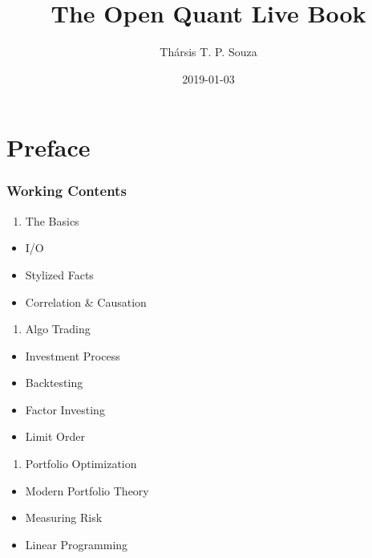 \documentclass[]{book}
\title{The Open Quant Live Book}
\author{Thársis T. P. Souza}
\date{2019-01-03}
\providecommand{\tightlist}{%
  \setlength{\itemsep}{0pt}\setlength{\parskip}{0pt}}
\begin{document}


\maketitle

{
\hypersetup{linkcolor=}
\setcounter{tocdepth}{1}
\tableofcontents
}
\chapter*{Preface}\label{preface}

\subsection*{Working Contents}\label{working-contents}

\begin{enumerate}
\def\labelenumi{\arabic{enumi}.}
\tightlist
\item
  The Basics
\end{enumerate}

\begin{itemize}
\tightlist
\item
  I/O
\item
  Stylized Facts
\item
  Correlation \& Causation
\end{itemize}

\begin{enumerate}
\def\labelenumi{\arabic{enumi}.}
\setcounter{enumi}{1}
\tightlist
\item
  Algo Trading
\end{enumerate}

\begin{itemize}
\tightlist
\item
  Investment Process
\item
  Backtesting
\item
  Factor Investing
\item
  Limit Order
\end{itemize}

\begin{enumerate}
\def\labelenumi{\arabic{enumi}.}
\setcounter{enumi}{2}
\tightlist
\item
  Portfolio Optimization
\end{enumerate}

\begin{itemize}
\tightlist
\item
  Modern Portfolio Theory
\item
  Measuring Risk
\item
  Linear Programming
\end{itemize}
\end{document}
